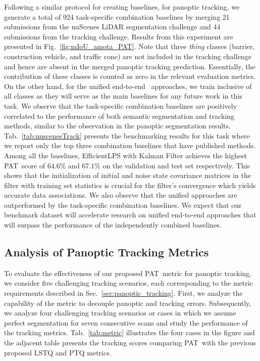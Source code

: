 \documentclass[letterpaper, 10 pt, journal, twoside]{IEEEtran}
\newcommand{\secref}[1]{Sec.~\ref{#1}}
\newcommand{\figref}[1]{Fig.~\ref{#1}}
\newcommand{\tabref}[1]{Tab.~\ref{#1}}
\newcommand{\newmet}{PAT}
\begin{document}
Following a similar protocol for creating baselines, for panoptic tracking, we generate a total of 924 task-specific combination baselines by merging 21 submissions from the nuScenes LiDAR segmentation challenge and 44 submissions from the tracking challenge. Results from this experiment are presented in \figref{fig:mIoU_amota_PAT}. Note that three \emph{thing} classes (barrier, construction vehicle, and traffic cone) are not included in the tracking challenge and hence are absent in the merged panoptic tracking prediction. Essentially, the contribution of these classes is counted as zero in the relevant evaluation metrics. On the other hand, for the unified end-to-end~\cite{hurtado2020mopt, aygun20214d} approaches, we train inclusive of all classes as they will serve as the main baselines for any future work in this task. We observe that the task-specific combination baselines are positively correlated to the performance of both semantic segmentation and tracking methods, similar to the observation in the panoptic segmentation results. \tabref{tab:nuscenesTrack} presents the benchmarking results for this task where we report only the top three combination baselines that have published methods. Among all the baselines, EfficientLPS with Kalman Filter achieves the highest \newmet~score of $64.6\%$ and $67.1\%$ on the validation and test set respectively. This shows that the initialization of initial and noise state covariance matrices in the filter with training set statistics is crucial for the filter's convergence which yields accurate data associations. We also observe that the unified approaches are outperformed by the task-specific combination baselines. We expect that our benchmark dataset will accelerate research on unified end-to-end approaches that will surpass the performance of the independently combined baselines.

\subsection{Analysis of Panoptic Tracking Metrics}
\label{subsec:new_metric_analysis}

To evaluate the effectiveness of our proposed \newmet~metric for panoptic tracking, we consider five challenging tracking scenarios, each corresponding to the metric requirements described in \secref{sec:panoptic_tracking}. First, we analyze the capability of the metric to decouple panoptic and tracking errors. Subsequently, we analyze four challenging tracking scenarios or cases in which we assume perfect segmentation for seven consecutive scans and study the performance of the tracking metrics. \tabref{tab:metric} illustrates the four cases in the figure and the adjacent table presents the tracking scores comparing \newmet~with the previous proposed LSTQ and PTQ metrics.
\end{document}
